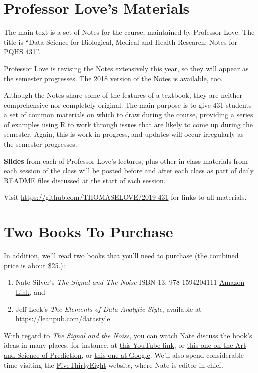 \documentclass[
]{book}
\providecommand{\tightlist}{%
  \setlength{\itemsep}{0pt}\setlength{\parskip}{0pt}}
\begin{document}
\hypertarget{professor-loves-materials}{%
\section{Professor Love's Materials}\label{professor-loves-materials}}

The main text is a set of Notes for the course, maintained by Professor Love. The title is ``Data Science for Biological, Medical and Health Research: Notes for PQHS 431''.

Professor Love is revising the Notes extensively this year, so they will appear as the semester progresses. The 2018 version of the Notes is available, too.

Although the Notes share some of the features of a textbook, they are neither comprehensive nor completely original. The main purpose is to give 431 students a set of common materials on which to draw during the course, providing a series of examples using R to work through issues that are likely to come up during the semester. Again, this is work in progress, and updates will occur irregularly as the semester progresses.

\textbf{Slides} from each of Professor Love's lectures, plus other in-class materials from each session of the class will be posted before and after each class as part of daily README files discussed at the start of each session.

Visit \url{https://github.com/THOMASELOVE/2019-431} for links to all materials.

\hypertarget{two-books-to-purchase}{%
\section{Two Books To Purchase}\label{two-books-to-purchase}}

In addition, we'll read two books that you'll need to purchase (the combined price is about \$25.):

\begin{enumerate}
\def\labelenumi{\arabic{enumi}.}
\tightlist
\item
  Nate Silver's \emph{The Signal and The Noise} ISBN-13: 978-1594204111 \href{https://www.amazon.com/Signal-Noise-Many-Predictions-Fail-but/dp/0143125087}{Amazon Link}, and
\item
  Jeff Leek's \emph{The Elements of Data Analytic Style}, available at \url{https://leanpub.com/datastyle}.
\end{enumerate}

With regard to \emph{The Signal and the Noise}, you can watch Nate discuss the book's ideas in many places, for instance, at \href{https://www.youtube.com/watch?v=z4zhI9uLs4U}{this YouTube link}, or \href{https://www.youtube.com/watch?v=eE4qCJBgfIk}{this one on the Art and Science of Prediction}, or \href{https://www.youtube.com/watch?v=mYIgSq-ZWE0}{this one at Google}. We'll also spend considerable time visiting the \href{http://fivethirtyeight.com/}{FiveThirtyEight} website, where Nate is editor-in-chief.
\end{document}

